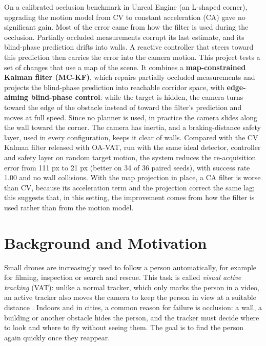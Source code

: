 \documentclass[12pt,a4paper]{article}
\begin{document}
On a calibrated occlusion benchmark in Unreal Engine (an L-shaped corner), upgrading the motion model from CV to constant acceleration (CA) gave no significant gain. Most of the error came from how the filter is used during the occlusion. Partially occluded measurements corrupt its last estimate, and its blind-phase prediction drifts into walls. A reactive controller that steers toward this prediction then carries the error into the camera motion. This project tests a set of changes that use a map of the scene. It combines a \textbf{map-constrained Kalman filter (MC-KF)}, which repairs partially occluded measurements and projects the blind-phase prediction into reachable corridor space, with \textbf{edge-aiming blind-phase control}: while the target is hidden, the camera turns toward the edge of the obstacle instead of toward the filter's prediction and moves at full speed. Since no planner is used, in practice the camera slides along the wall toward the corner. The camera has inertia, and a braking-distance safety layer, used in every configuration, keeps it clear of walls. Compared with the CV Kalman filter released with OA-VAT, run with the same ideal detector, controller and safety layer on random target motion, the system reduces the re-acquisition error from 111 px to 21 px (better on 34 of 36 paired seeds), with success rate 1.00 and no wall collisions.
With the map projection in place, a CA filter is worse than CV, because its acceleration term and the projection correct the same lag; this suggests that, in this setting, the improvement comes from how the filter is used rather than from the motion model.

\clearpage
\tableofcontents
\clearpage
\section{Background and Motivation}
Small drones are increasingly used to follow a person automatically, for example for filming, inspection or search and rescue.
This task is called \emph{visual active tracking} (VAT): unlike a normal tracker, which only marks the person in a video, an active tracker also moves the camera to keep the person in view at a suitable distance \cite{r1,r2}.
Indoors and in cities, a common reason for failure is occlusion: a wall, a building or another obstacle hides the person, and the tracker must decide where to look and where to fly without seeing them.
The goal is to find the person again quickly once they reappear.
\end{document}
